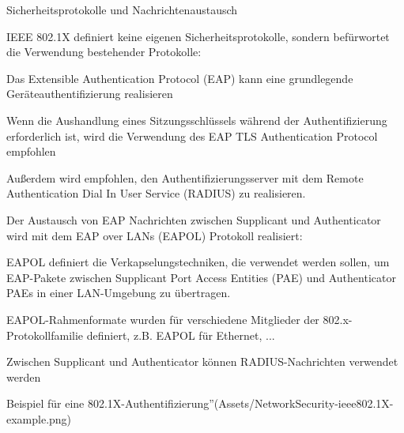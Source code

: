 \documentclass[a4paper]{article}
\begin{document}
\begin{multicols}{3}
      Sicherheitsprotokolle und Nachrichtenaustausch
      \begin{itemize*}
            \item IEEE 802.1X definiert keine eigenen Sicherheitsprotokolle, sondern befürwortet die Verwendung bestehender Protokolle:
            \begin{itemize*}
                  \item Das Extensible Authentication Protocol (EAP) kann eine grundlegende Geräteauthentifizierung realisieren
                  \item Wenn die Aushandlung eines Sitzungsschlüssels während der Authentifizierung erforderlich ist, wird die Verwendung des EAP TLS Authentication Protocol empfohlen
                  \item Außerdem wird empfohlen, den Authentifizierungsserver mit dem Remote Authentication Dial In User Service (RADIUS) zu realisieren.
            \end{itemize*}
            \item Der Austausch von EAP Nachrichten zwischen Supplicant und Authenticator wird mit dem EAP over LANs (EAPOL) Protokoll realisiert:
            \begin{itemize*}
                  \item EAPOL definiert die Verkapselungstechniken, die verwendet werden sollen, um EAP-Pakete zwischen Supplicant Port Access Entities (PAE) und Authenticator PAEs in einer LAN-Umgebung zu übertragen.
                  \item EAPOL-Rahmenformate wurden für verschiedene Mitglieder der 802.x-Protokollfamilie definiert, z.B. EAPOL für Ethernet, ...
                  \item Zwischen Supplicant und Authenticator können RADIUS-Nachrichten verwendet werden
            \end{itemize*}
      \end{itemize*}

      Beispiel für eine 802.1X-Authentifizierung''(Assets/NetworkSecurity-ieee802.1X-example.png)

\end{multicols}
\end{document}
